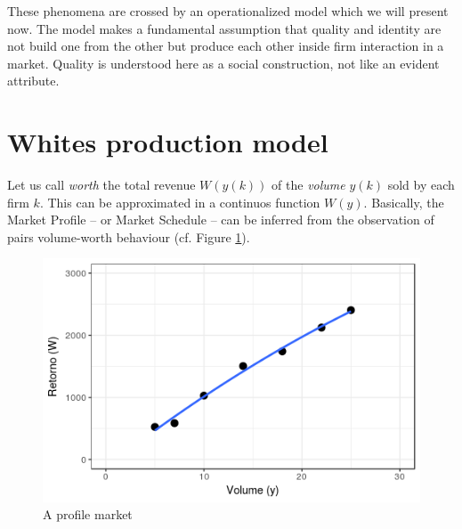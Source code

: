 \documentclass[a4paper, 12pt, openright, oneside, german, french, brazil, english]{abntex2}
\begin{document}

	These phenomena are crossed by an operationalized model which we will present now. The model makes a fundamental assumption that quality and identity are not build one from the other but produce each other inside firm interaction in a market. Quality is understood here as a social construction, not like an evident attribute.
	
	\section{Whites production model}
	
	
	Let us call \textit{worth} the total revenue $W(y(k))$ of the \textit{volume} $y(k)$ sold by each firm $k$. This can be approximated in a continuos function $W(y)$. Basically, the Market Profile -- or Market Schedule -- can be inferred from the observation of pairs volume-worth behaviour (cf. Figure \ref{white_1.2}). 
	
	
	\begin{figure}[ht]
		\centering
		\caption{A profile market}
		\label{white_1.2}
		\includegraphics[scale=1]{white_1_2.png}
	\end{figure}
	
\end{document}
